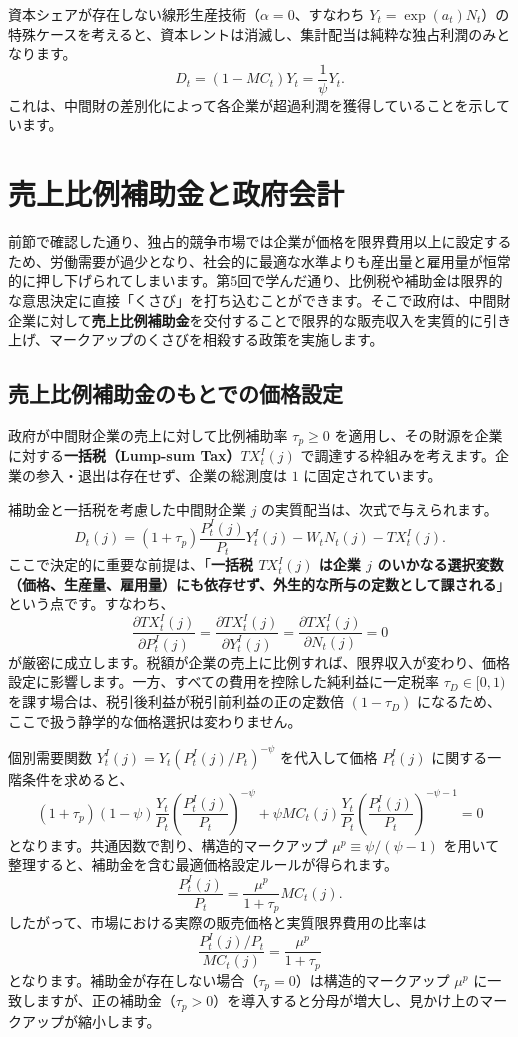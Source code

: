 \documentclass[
  japanese,
  lualatex,
  ja=standard,
  12pt,
  a4paper]{ltjsarticle}
\begin{document}
資本シェアが存在しない線形生産技術（\(\alpha = 0\)、すなわち
\(Y_t = \exp(a_t)N_t\)）の特殊ケースを考えると、資本レントは消滅し、集計配当は純粋な独占利潤のみとなります。
\[
D_t = (1 - MC_t) Y_t = \frac{1}{\psi} Y_t.
\]
これは、中間財の差別化によって各企業が超過利潤を獲得していることを示しています。

\section{売上比例補助金と政府会計}\label{ux58f2ux4e0aux6bd4ux4f8bux88dcux52a9ux91d1ux3068ux653fux5e9cux4f1aux8a08}

前節で確認した通り、独占的競争市場では企業が価格を限界費用以上に設定するため、労働需要が過少となり、社会的に最適な水準よりも産出量と雇用量が恒常的に押し下げられてしまいます。第5回で学んだ通り、比例税や補助金は限界的な意思決定に直接「くさび」を打ち込むことができます。そこで政府は、中間財企業に対して\textbf{売上比例補助金}を交付することで限界的な販売収入を実質的に引き上げ、マークアップのくさびを相殺する政策を実施します。

\subsection{売上比例補助金のもとでの価格設定}\label{ux58f2ux4e0aux6bd4ux4f8bux88dcux52a9ux91d1ux306eux3082ux3068ux3067ux306eux4fa1ux683cux8a2dux5b9a}

政府が中間財企業の売上に対して比例補助率 \(\tau_p \geq 0\)
を適用し、その財源を企業に対する\textbf{一括税（Lump-sum
Tax）\(TX_t^I(j)\)}
で調達する枠組みを考えます。企業の参入・退出は存在せず、企業の総測度は
\(1\) に固定されています。

補助金と一括税を考慮した中間財企業 \(j\)
の実質配当は、次式で与えられます。 \[
D_t(j) = (1+\tau_p) \frac{P_t^I(j)}{P_t} Y_t^I(j) - W_t N_t(j) - TX_t^I(j).
\] ここで決定的に重要な前提は、「\textbf{一括税 \(TX_t^I(j)\) は企業
\(j\)
のいかなる選択変数（価格、生産量、雇用量）にも依存せず、外生的な所与の定数として課される}」という点です。すなわち、
\[
\frac{\partial TX_t^I(j)}{\partial P_t^I(j)} = \frac{\partial TX_t^I(j)}{\partial Y_t^I(j)} = \frac{\partial TX_t^I(j)}{\partial N_t(j)} = 0
\]
が厳密に成立します。税額が企業の売上に比例すれば、限界収入が変わり、価格設定に影響します。一方、すべての費用を控除した純利益に一定税率
\(\tau_D \in [0,1)\) を課す場合は、税引後利益が税引前利益の正の定数倍
\((1-\tau_D)\) になるため、ここで扱う静学的な価格選択は変わりません。

個別需要関数 \(Y_t^I(j) = Y_t (P_t^I(j)/P_t)^{-\psi}\) を代入して価格
\(P_t^I(j)\) に関する一階条件を求めると、 \[
(1+\tau_p)(1-\psi) \frac{Y_t}{P_t} \left( \frac{P_t^I(j)}{P_t} \right)^{-\psi} + \psi MC_t(j) \frac{Y_t}{P_t} \left( \frac{P_t^I(j)}{P_t} \right)^{-\psi - 1} = 0
\] となります。共通因数で割り、構造的マークアップ
\(\mu^p \equiv \psi/(\psi-1)\)
を用いて整理すると、補助金を含む最適価格設定ルールが得られます。 \[
\frac{P_t^I(j)}{P_t} = \frac{\mu^p}{1+\tau_p} MC_t(j).
\] したがって、市場における実際の販売価格と実質限界費用の比率は \[
\frac{P_t^I(j)/P_t}{MC_t(j)} = \frac{\mu^p}{1+\tau_p}
\]
となります。補助金が存在しない場合（\(\tau_p = 0\)）は構造的マークアップ
\(\mu^p\)
に一致しますが、正の補助金（\(\tau_p > 0\)）を導入すると分母が増大し、見かけ上のマークアップが縮小します。
\end{document}
